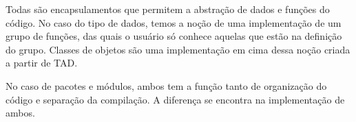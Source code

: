 Todas são encapsulamentos que permitem a abstração de dados e funções do
código. No caso do tipo de dados, temos a noção de uma implementação de um
grupo de funções, das quais o usuário só conhece aquelas que estão na definição
do grupo. Classes de objetos são uma implementação em cima dessa noção criada a
partir de TAD.

No caso de pacotes e módulos, ambos tem a função tanto de organização do código
e separação da compilação. A diferença se encontra na implementação de ambos.

